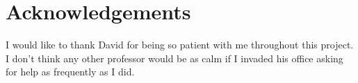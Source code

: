 
\vspace{-0.4cm}
\section*{Acknowledgements}
\vspace{-0.2cm}

I would like to thank David for being so patient with me throughout this project. I don't think any other professor would be as calm if I invaded his office asking for help as frequently as I did.

\vspace{-0.4cm}
